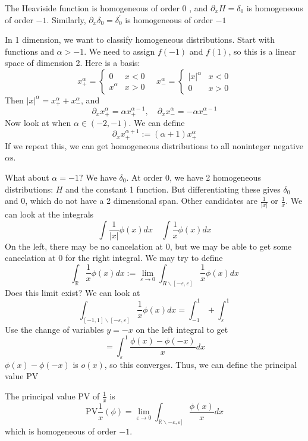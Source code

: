 \begin{example}
    The Heaviside function is homogeneous of order 0 , and $\partial_{x} H=\delta_{0}$ is homogeneous of order $-1$. Similarly, $\partial_{x} \delta_{0}=\delta_{0}^{\prime}$ is homogeneous of order $-1$
\end{example}
In 1 dimension, we want to classify homogeneous distributions. Start with functions and $\alpha>-1$. We need to assign $f(-1)$ and $f(1)$, so this is a linear space of dimension 2. Here is a basis:
$$
x_{+}^{\alpha}=\left\{\begin{array}{ll}
0 & x<0 \\
x^{\alpha} & x>0
\end{array} \quad x_{-}^ \alpha = \begin{cases}|x|^{\alpha} & x<0 \\
0 & x>0\end{cases}\right.
$$
Then $|x|^{\alpha}=x_{+}^{\alpha}+x_{-}^{\alpha}$, and
$$
\partial_{x} x_{+}^{\alpha}=\alpha x_{+}^{\alpha-1}, \quad \partial_{x} x_{-}^{\alpha}=-\alpha x_{-}^{\alpha-1}
$$
Now look at when $\alpha \in(-2,-1)$. We can define
$$
\partial_{x} x_{+}^{\alpha+1}:=(\alpha+1) x_{+}^{\alpha}
$$
If we repeat this, we can get homogeneous distributions to all noninteger negative $\alpha \mathrm{s}$.

What about $\alpha=-1 ?$ We have $\delta_{0} .$ At order 0, we have 2 homogeneous distributions: $H$ and the constant 1 function. But differentiating these gives $\delta_{0}$ and 0, which do not have a 2 dimensional span. Other candidates are $\frac{1}{|x|}$ or $\frac{1}{x}$. We can look at the integrals
$$
\int \frac{1}{|x|} \phi(x) d x \quad \int \frac{1}{x} \phi(x) d x
$$
On the left, there may be no cancelation at 0, but we may be able to get some cancelation at 0 for the right integral. We may try to define
$$
\int_{\mathbb{R}} \frac{1}{x} \phi(x) d x:=\lim _{\varepsilon \rightarrow 0} \int_{R \backslash[-\varepsilon, \varepsilon]} \frac{1}{x} \phi(x) d x
$$
Does this limit exist? We can look at
$$
\int_{[-1,1] \backslash[-\varepsilon, \varepsilon]} \frac{1}{x} \phi(x) d x=\int_{-1}^{1}+\int_{\varepsilon}^{1}
$$
Use the change of variables $y=-x$ on the left integral to get
$$
=\int_{\varepsilon}^{1} \frac{\phi(x)-\phi(-x)}{x} d x
$$
$\phi(x)-\phi(-x)$ is $o(x)$, so this converges.
Thus, we can define the principal value PV 

\begin{definition}
    The principal value PV of $\frac{1}{x}$ is 
    $$
    \mathrm{PV} \frac{1}{x}(\phi)=\lim _{\varepsilon \rightarrow 0} \int_{\mathbb{R} \backslash-\varepsilon, \varepsilon]} \frac{\phi(x)}{x} d x
    $$
    which is homogeneous of order $-1$.

\end{definition}
